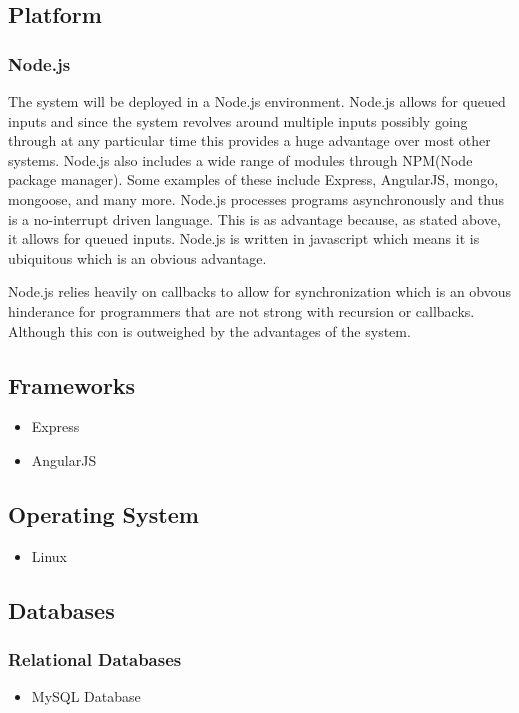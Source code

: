 \subsection{Platform}
\subsubsection{Node.js}
The system will be deployed in a Node.js environment. Node.js allows for queued inputs and since the system revolves around multiple inputs possibly going through at any particular time this provides a huge advantage over most other systems. Node.js also includes a wide range of modules through NPM(Node package manager). Some examples of these include Express, AngularJS, mongo, mongoose, and many more. Node.js processes programs asynchronously and thus is a no-interrupt driven language. This is as advantage because, as stated above, it allows for queued inputs. Node.js is written in javascript which means it is ubiquitous which is an obvious advantage.

Node.js relies heavily on callbacks to allow for synchronization which is an obvous hinderance for programmers that are not strong with recursion or callbacks. Although this con is outweighed by the advantages of the system.


\subsection{Frameworks}
\begin{itemize}
		\item Express
		\item AngularJS
\end{itemize}

\subsection{Operating System}
\begin{itemize}
		\item Linux
\end{itemize}
	
	
\subsection{Databases}
\subsubsection{Relational Databases}
\begin{itemize}
	\item MySQL Database
\end{itemize}
	

